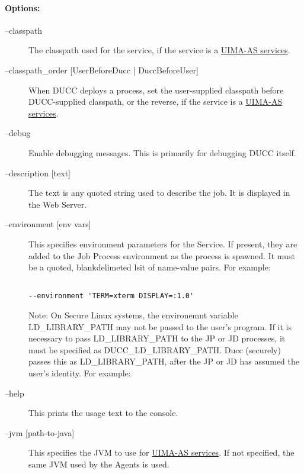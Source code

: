     \paragraph{Options:}
    \begin{description}

        \item[--classpath] The classpath used for the service, if the service is a
          \hyperref[sec:services.types]{UIMA-AS services}.
          
        \item[--classpath\_order {[UserBeforeDucc | DuccBeforeUser]} ] When DUCC deploys a process,
          set the user-supplied classpath before DUCC-supplied classpath, or the reverse, if the
          service is a \hyperref[sec:services.types]{UIMA-AS services}.
          
        \item[--debug ]
          Enable debugging messages. This is primarily for debugging DUCC itself. 
          
        \item[--description {[text]}] The text is any quoted string used to describe the job. It is
          displayed in the Web Server.
        
        \item[--environment {[env vars]}]  
          This specifies environment parameters for the Service. If present, they are added 
          to the Job Process environment as the process is spawned. It must be a quoted, blankdelimeted 
          lsit of name-value pairs. For example: 
\begin{verbatim}

--environment 'TERM=xterm DISPLAY=:1.0'
\end{verbatim}
          
          Note: On Secure Linux systems, the environemnt variable 
          LD\_LIBRARY\_PATH may not be passed to the user's program. If it is 
          necessary to pass LD\_LIBRARY\_PATH to the JP or JD processes, it must be 
          specified as DUCC\_LD\_LIBRARY\_PATH. Ducc (securely) passes this as 
          LD\_LIBRARY\_PATH, after the JP or JD has assumed the user's identity. For 
          example: 

        \item[--help ] This prints the usage text to the console.

        \item[--jvm {[path-to-java]}] This specifies the JVM to use for 
          \hyperref[sec:services.types]{UIMA-AS services}. If not
          specified, the same JVM used by the Agents is used.


\end{description}
